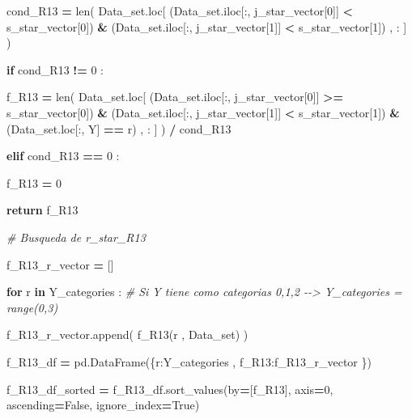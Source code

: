 \documentclass[
  11pt,
  a4paper,
]{article}
\newenvironment{Shaded}{\begin{snugshade}}{\end{snugshade}}
\newcommand{\BuiltInTok}[1]{#1}
\newcommand{\CommentTok}[1]{\textcolor[rgb]{0.56,0.35,0.01}{\textit{#1}}}
\newcommand{\ControlFlowTok}[1]{\textcolor[rgb]{0.13,0.29,0.53}{\textbf{#1}}}
\newcommand{\DecValTok}[1]{\textcolor[rgb]{0.00,0.00,0.81}{#1}}
\newcommand{\KeywordTok}[1]{\textcolor[rgb]{0.13,0.29,0.53}{\textbf{#1}}}
\newcommand{\NormalTok}[1]{#1}
\newcommand{\OperatorTok}[1]{\textcolor[rgb]{0.81,0.36,0.00}{\textbf{#1}}}
\newcommand{\StringTok}[1]{\textcolor[rgb]{0.31,0.60,0.02}{#1}}
\newcommand{\VariableTok}[1]{\textcolor[rgb]{0.00,0.00,0.00}{#1}}
\begin{document}
\begin{Shaded}
\begin{Highlighting}[]
\NormalTok{                    cond\_R13 }\OperatorTok{=} \BuiltInTok{len}\NormalTok{( Data\_set.loc[ (Data\_set.iloc[:, j\_star\_vector[}\DecValTok{0}\NormalTok{]] }\OperatorTok{\textless{}}\NormalTok{ s\_star\_vector[}\DecValTok{0}\NormalTok{]) }\OperatorTok{\&}\NormalTok{ (Data\_set.iloc[:, j\_star\_vector[}\DecValTok{1}\NormalTok{]] }\OperatorTok{\textless{}}\NormalTok{ s\_star\_vector[}\DecValTok{1}\NormalTok{]) , : ] ) }

                    \ControlFlowTok{if}\NormalTok{  cond\_R13 }\OperatorTok{!=} \DecValTok{0}\NormalTok{ :}

\NormalTok{                        f\_R13 }\OperatorTok{=} \BuiltInTok{len}\NormalTok{( Data\_set.loc[ (Data\_set.iloc[:, j\_star\_vector[}\DecValTok{0}\NormalTok{]] }\OperatorTok{\textgreater{}=}\NormalTok{ s\_star\_vector[}\DecValTok{0}\NormalTok{]) }\OperatorTok{\&}\NormalTok{ (Data\_set.iloc[:, j\_star\_vector[}\DecValTok{1}\NormalTok{]] }\OperatorTok{\textless{}}\NormalTok{ s\_star\_vector[}\DecValTok{1}\NormalTok{]) }\OperatorTok{\&}\NormalTok{ (Data\_set.loc[:, }\StringTok{\textquotesingle{}Y\textquotesingle{}}\NormalTok{] }\OperatorTok{==}\NormalTok{ r) , : ] ) }\OperatorTok{/}\NormalTok{ cond\_R13}

                    \ControlFlowTok{elif}\NormalTok{ cond\_R13 }\OperatorTok{==} \DecValTok{0}\NormalTok{ :}

\NormalTok{                        f\_R13 }\OperatorTok{=} \DecValTok{0}

                    \ControlFlowTok{return}\NormalTok{ f\_R13}

                
            \CommentTok{\# Busqueda de r\_star\_R13}

\NormalTok{                f\_R13\_r\_vector }\OperatorTok{=}\NormalTok{ []}

                \ControlFlowTok{for}\NormalTok{ r }\KeywordTok{in}\NormalTok{ Y\_categories :  }\CommentTok{\# Si Y tiene como categorias 0,1,2 {-}{-}\textgreater{} Y\_categories = range(0,3)}

\NormalTok{                    f\_R13\_r\_vector.append( f\_R13(r , Data\_set) )}

\NormalTok{                f\_R13\_df }\OperatorTok{=}\NormalTok{ pd.DataFrame(\{}\StringTok{\textquotesingle{}r\textquotesingle{}}\NormalTok{:Y\_categories  , }\StringTok{\textquotesingle{}f\_R13\textquotesingle{}}\NormalTok{:f\_R13\_r\_vector \})}
        
\NormalTok{                f\_R13\_df\_sorted }\OperatorTok{=}\NormalTok{ f\_R13\_df.sort\_values(by}\OperatorTok{=}\NormalTok{[}\StringTok{\textquotesingle{}f\_R13\textquotesingle{}}\NormalTok{], axis}\OperatorTok{=}\DecValTok{0}\NormalTok{, ascending}\OperatorTok{=}\VariableTok{False}\NormalTok{, ignore\_index}\OperatorTok{=}\VariableTok{True}\NormalTok{)}


\end{Highlighting}
\end{Shaded}
\end{document}
